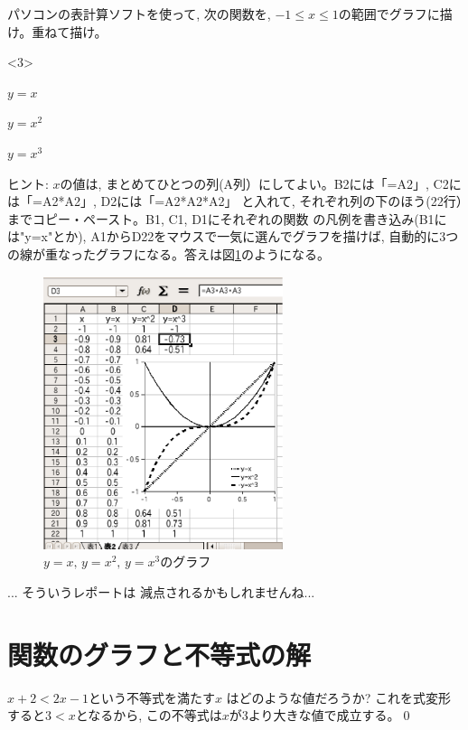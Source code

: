 \begin{q}\label{q:comp_graph0} パソコンの表計算ソフトを使って, 
次の関数を, $-1 \le x \le 1$の範囲でグラフに描け。重ねて描け。
\begin{edaenumerate}<3>
\item $y=x$
\item $y=x^2$
\item $y=x^3$
\end{edaenumerate}
{\small ヒント: $x$の値は, まとめてひとつの列(A列）にしてよい。B2には「=A2」, C2には「=A2*A2」, D2には「=A2*A2*A2」
と入れて, それぞれ列の下のほう(22行）までコピー・ペースト。B1, C1, D1にそれぞれの関数
の凡例を書き込み(B1には"y=x"とか), A1からD22をマウスで一気に選んでグラフを描けば, 
自動的に3つの線が重なったグラフになる。答えは図\ref{fig:PC_graph2}のようになる。}\end{q}
\begin{figure}
    \centering
    \includegraphics[width=7.0cm]{PC_graph2.eps}
    \caption{$y=x,\, y=x^2,\, y=x^3$のグラフ\label{fig:PC_graph2}}
\end{figure}

\begin{freqmiss}{\small{} ... そういうレポートは 
減点されるかもしれませんね...}\end{freqmiss}
\hv



\section{関数のグラフと不等式の解}

\begin{exmpl}\label{exmpl:ineq001} $x+2<2x-1$という不等式を満たす$x$
はどのような値だろうか? これを式変形すると$3<x$となるから, 
この不等式は$x$が3より大きな値で成立する。\qed\end{exmpl}

